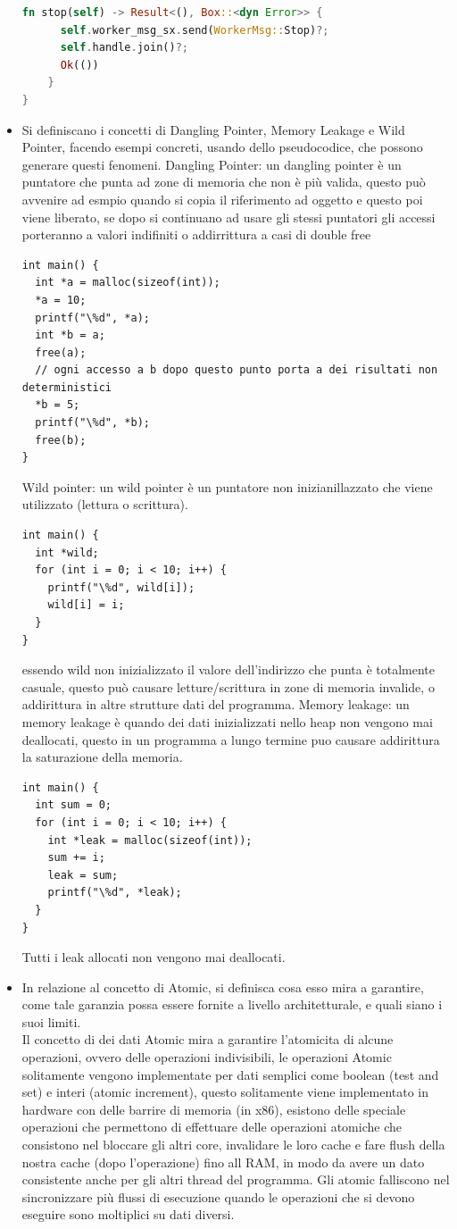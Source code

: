 \documentclass[12pt]{article}
\begin{document}
\begin{itemize}
\begin{lstlisting}[language=rust]
    fn stop(self) -> Result<(), Box::<dyn Error>> {
      self.worker_msg_sx.send(WorkerMsg::Stop)?;
      self.handle.join()?;
      Ok(())
    }
}
  \end{lstlisting}
  \item Si definiscano i concetti di Dangling Pointer, Memory Leakage e Wild Pointer, facendo esempi
concreti, usando dello pseudocodice, che possono generare questi fenomeni. Dangling Pointer: un dangling pointer \`e un puntatore che punta ad zone di memoria che non \`e pi\`u valida, questo pu\`o avvenire ad esmpio quando si copia il riferimento ad oggetto e questo poi viene liberato, se dopo si continuano ad usare gli stessi puntatori gli accessi porteranno a valori indifiniti o addirrittura a casi di double free
  \begin{lstlisting}[langua=rust]
int main() {
  int *a = malloc(sizeof(int));
  *a = 10;
  printf("\%d", *a);
  int *b = a;
  free(a);
  // ogni accesso a b dopo questo punto porta a dei risultati non deterministici
  *b = 5;
  printf("\%d", *b);
  free(b);
}
  \end{lstlisting}
  Wild pointer: un wild pointer \`e un puntatore non inizianillazzato che viene utilizzato (lettura o scrittura).
  \begin{lstlisting}[langua=rust]
int main() {
  int *wild;
  for (int i = 0; i < 10; i++) {
    printf("\%d", wild[i]);
    wild[i] = i;
  }
}
  \end{lstlisting}
  essendo wild non inizializzato il valore dell'indirizzo che punta \`e totalmente casuale, questo pu\`o causare letture/scrittura in zone di memoria invalide, o addirittura in altre strutture dati del programma. Memory leakage: un memory leakage \`e quando dei dati inizializzati nello heap non vengono mai deallocati, questo in un programma a lungo termine puo causare addirittura la saturazione della memoria.
  \begin{lstlisting}[langua=rust]
int main() {
  int sum = 0;
  for (int i = 0; i < 10; i++) {
    int *leak = malloc(sizeof(int));
    sum += i;
    leak = sum;
    printf("\%d", *leak);
  }
}
  \end{lstlisting}
  Tutti i leak allocati non vengono mai deallocati.
  \item In relazione al concetto di Atomic, si definisca cosa esso mira a garantire, come tale garanzia possa essere fornite a livello architetturale, e quali siano i suoi limiti. \\ Il concetto di dei dati Atomic mira a garantire l'atomicita di alcune operazioni, ovvero delle operazioni indivisibili, le operazioni Atomic solitamente vengono implementate per dati semplici come boolean (test and set) e interi (atomic increment), questo solitamente viene implementato in hardware con delle barrire di memoria (in x86), esistono delle speciale operazioni che permettono di effettuare delle operazioni atomiche che consistono nel bloccare gli altri core, invalidare le loro cache e fare flush della nostra cache (dopo l'operazione) fino all RAM, in modo da avere un dato consistente anche per gli altri thread del programma. Gli atomic falliscono nel sincronizzare pi\`u flussi di esecuzione quando le operazioni che si devono eseguire sono moltiplici su dati diversi.

\end{itemize}
\end{document}
